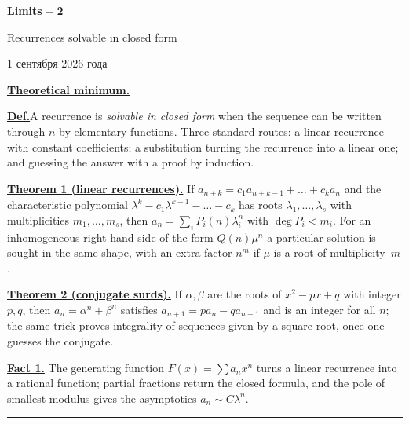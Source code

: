 \documentclass[11pt,a4paper]{article}
\newcommand{\head}[2][0pt]{\par\vspace{\dimexpr0.85em+#1\relax}\noindent\textbf{\underline{#2}}\quad}
\begin{document}
\begin{center}
{\huge\bfseries Limits -- 2\par}\vspace{0.9em}
{\Large Recurrences solvable in closed form\par}\vspace{0.88em}
{\foreignlanguage{russian}{1 сентября 2026 года}\par}
\end{center}\vspace{-1pt}

\noindent\textbf{\underline{Theoretical minimum.}}

\vspace{5pt}\noindent\textbf{\underline{Def.}}\quad A recurrence is \emph{solvable in closed form} when the sequence can be written
through $n$ by elementary functions. Three standard routes: a linear recurrence with constant
coefficients; a substitution turning the recurrence into a linear one; and guessing the answer
with a proof by induction.

\head{Theorem 1 (linear recurrences).} If $a_{n+k}=c_1a_{n+k-1}+\dots+c_ka_n$ and the
characteristic polynomial $\lambda^k-c_1\lambda^{k-1}-\dots-c_k$ has roots
$\lambda_1,\dots,\lambda_s$ with multiplicities $m_1,\dots,m_s$, then
$a_n=\sum_iP_i(n)\lambda_i^n$ with $\deg P_i<m_i$. For an inhomogeneous right-hand side of the
form $Q(n)\mu^n$ a particular solution is sought in the same shape, with an extra factor $n^m$
if $\mu$ is a root of multiplicity~$m$.

\head[3.8pt]{Theorem 2 (conjugate surds).} If $\alpha,\beta$ are the roots of $x^2-px+q$ with integer
$p,q$, then $a_n=\alpha^n+\beta^n$ satisfies $a_{n+1}=pa_n-qa_{n-1}$ and is an integer for all
$n$; the same trick proves integrality of sequences given by a square root, once one guesses the
conjugate.

\head[5.9pt]{Fact 1.} The generating function $F(x)=\sum a_nx^n$ turns a linear recurrence into a
rational function; partial fractions return the closed formula, and the pole of smallest modulus
gives the asymptotics $a_n\sim C\lambda^n$.


\noindent\rule{\textwidth}{0.4pt}\par\vspace{4pt}
\end{document}
